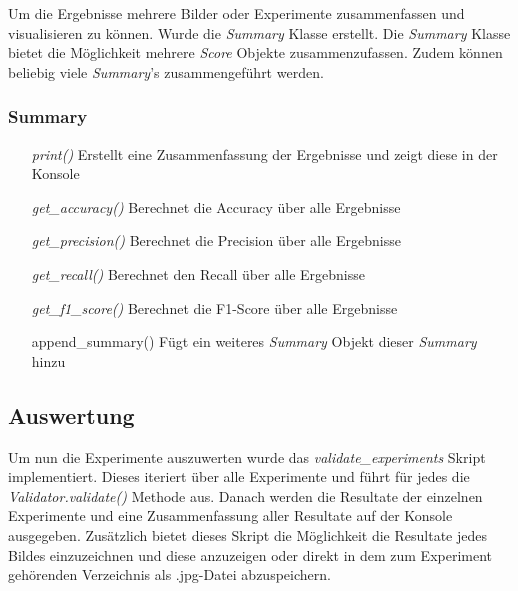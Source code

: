 \noindent
Um die Ergebnisse mehrere Bilder oder Experimente zusammenfassen und visualisieren zu können. Wurde die \textit{Summary} Klasse erstellt. Die \textit{Summary} Klasse bietet die Möglichkeit mehrere \textit{Score} Objekte zusammenzufassen. Zudem können beliebig viele \textit{Summary}'s zusammengeführt werden.

\subsubsection{Summary}

\begin{itemize}[leftmargin=*,labelindent=3cm, labelsep=1cm]
	\item[\textit{print()}] Erstellt eine Zusammenfassung der Ergebnisse und zeigt diese in der Konsole
	\item[\textit{get\_accuracy()}] Berechnet die Accuracy über alle Ergebnisse
	\item[\textit{get\_precision()}] Berechnet die Precision über alle Ergebnisse
	\item[\textit{get\_recall()}] Berechnet den Recall über alle Ergebnisse
	\item[\textit{get\_f1\_score()}] Berechnet die F1-Score über alle Ergebnisse
	\item[append\_summary()] Fügt ein weiteres \textit{Summary} Objekt dieser \textit{Summary} hinzu
\end{itemize}

\subsection{Auswertung}

Um nun die Experimente auszuwerten wurde das \textit{validate\_experiments} Skript implementiert. Dieses iteriert über alle Experimente und führt für jedes die \textit{Validator.validate()} Methode aus. Danach werden die Resultate der einzelnen Experimente und eine Zusammenfassung aller Resultate auf der Konsole ausgegeben. Zusätzlich bietet dieses Skript die Möglichkeit die Resultate jedes Bildes einzuzeichnen und diese anzuzeigen oder direkt in dem zum Experiment gehörenden Verzeichnis als .jpg-Datei abzuspeichern.
